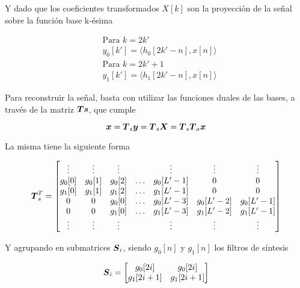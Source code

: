 Y dado que los coeficientes transformados $X[k]$ son la proyección de la señal sobre la función base k-ésima
	
	\begin{align}
		&\text{Para $k=2k'$}	\nonumber \\
		&y_0[k']=\langle h_0[2k'-n], x[n]\rangle		
	\end{align}
	\begin{align}
		&\text{Para $k=2k'+1$}	\nonumber \\
		&y_1[k']=\langle h_1[2k'-n], x[n]\rangle
	\end{align}

Para reconstruir la señal, basta con utilizar las funciones duales de las bases, a través de la matriz $\boldsymbol{Ts}$, que cumple

	\begin{equation}
		\boldsymbol{x}=\boldsymbol{T}_s\boldsymbol{y}=\boldsymbol{T}_s\boldsymbol{X}=\boldsymbol{T}_s\boldsymbol{T}_a\boldsymbol{x}
	\end{equation}

La misma tiene la siguiente forma

	\begin{equation}
		\vect{T}^T_s
		=
		\begin{bmatrix*}[c]
			\vdots & \vdots & \vdots & & \vdots & \vdots & \vdots\\
			g_0[0] & g_0[1] & g_0[2] & \hdots & g_0[L'-1] & 0 & 0 \\
			g_1[0] & g_1[1] & g_1[2] & \hdots & g_1[L'-1] & 0 & 0 \\
			0 & 0 & g_0[0] & \hdots & g_0[L'-3] & g_0[L'-2] & g_0[L'-1] \\
			0 & 0 & g_1[0] & \hdots & g_1[L'-3] & g_1[L'-2] & g_1[L'-1] \\
			\vdots & \vdots & \vdots & & \vdots & \vdots & \vdots \\
		\end{bmatrix*}	
	\end{equation}

Y agrupando en submatrices $\boldsymbol{S}_i$, siendo $g_0[n]$ y $g_1[n]$ los filtros de síntesis

	\begin{equation}
		\vect{S}_i
		=
		\begin{bmatrix*}[c]
			g_0[2i] & g_0[2i] \\
			g_1[2i+1] & g_1[2i+1] \\
		\end{bmatrix*}
	\end{equation}
	

